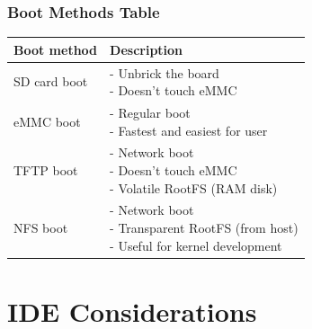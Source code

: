 \documentclass[aspectratio=169]{beamer}
\begin{document}
\begin{frame}
  \frametitle{Boot Methods Table}
      \begin{table}
        \begin{tabular}{@{} ll @{}}
          \toprule
          Boot method & Description\\
          \midrule
          SD card boot & \makecell[l]{
            - Unbrick the board               \\
            - Doesn't touch eMMC
          }                                   \\
          \hline
          eMMC boot & \makecell[l]{
            - Regular boot                    \\
            - Fastest and easiest for user
          }                                   \\
          \hline
          TFTP boot & \makecell[l]{
            - Network boot                    \\
            - Doesn't touch eMMC              \\
            - Volatile RootFS (RAM disk)
          }                                   \\
          \hline
          NFS boot & \makecell[l]{
            - Network boot                    \\
            - Transparent RootFS (from host)  \\
            - Useful for kernel development
          }                                   \\
          \bottomrule
        \end{tabular}
        \vspace*{-10mm} %
      \end{table}
\end{frame}

\section{IDE Considerations}
\end{document}
